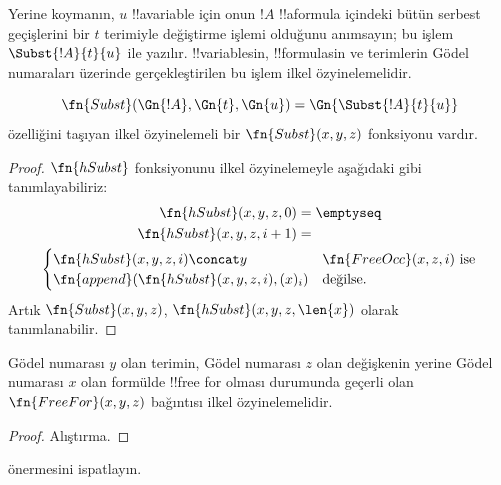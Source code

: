 \documentclass[../../../include/open-logic-section]{subfiles}
\begin{document}

Yerine koymanın, $u$ !!a{variable} için onun $!A$ !!a{formula} içindeki bütün
serbest geçişlerini bir $t$ terimiyle değiştirme işlemi olduğunu anımsayın; bu işlem
$\Subst{!A}{t}{u}$ ile yazılır. !!{variable}s{}in, !!{formula}s{}in ve terimlerin
Gödel numaraları üzerinde gerçekleştirilen bu işlem ilkel özyinelemelidir.

\begin{prop}
\[
\fn{Subst}(\Gn{!A}, \Gn{t}, \Gn{u}) = \Gn{\Subst{!A}{t}{u}}
\]
özelliğini taşıyan ilkel özyinelemeli bir $\fn{Subst}(x,y,z)$ fonksiyonu
vardır.
\end{prop}

\begin{proof}
$\fn{hSubst}$ fonksiyonunu ilkel özyinelemeyle aşağıdaki gibi
tanımlayabiliriz:
\begin{multline*}
\begin{aligned}
\fn{hSubst}(x, y, z, 0) & = \emptyseq \\
\fn{hSubst}(x, y, z, i+1) & =
\end{aligned}\\
\begin{cases}
\fn{hSubst}(x, y, z, i) \concat y & \text{$\fn{FreeOcc}(x, z, i)$ ise} \\
\fn{append}(\fn{hSubst}(x, y, z, i), (x)_{i}) & \text{değilse.}
\end{cases}
\end{multline*}
Artık $\fn{Subst}(x,y,z)$, $\fn{hSubst}(x,y,z,\len{x})$ olarak
tanımlanabilir.
\end{proof}

\begin{prop}
Gödel numarası $y$ olan terimin, Gödel numarası $z$ olan değişkenin yerine
Gödel numarası $x$ olan formülde !!{free for} olması durumunda geçerli olan
$\fn{FreeFor}(x,y,z)$ bağıntısı ilkel özyinelemelidir.
\end{prop}

\begin{proof} Alıştırma. \end{proof}

\begin{prob}
 önermesini ispatlayın.
\end{prob}
\end{document}
